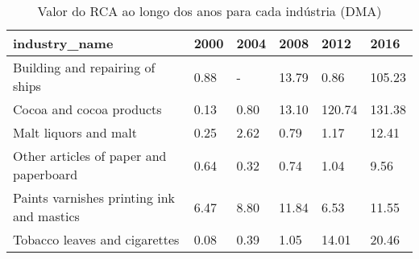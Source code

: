 \begin{table}
\centering
\caption{Valor do RCA ao longo dos anos para cada indústria (DMA)}
\begin{tabular}{p{6cm}p{1.5cm}p{1.5cm}p{1.5cm}p{1.5cm}p{1.5cm}}
\toprule
                            industry\_name & 2000 & 2004 &  2008 &   2012 &   2016 \\
\midrule
          Building and repairing of ships & 0.88 &    - & 13.79 &   0.86 & 105.23 \\
                 Cocoa and cocoa products & 0.13 & 0.80 & 13.10 & 120.74 & 131.38 \\
                    Malt liquors and malt & 0.25 & 2.62 &  0.79 &   1.17 &  12.41 \\
   Other articles of paper and paperboard & 0.64 & 0.32 &  0.74 &   1.04 &   9.56 \\
Paints varnishes printing ink and mastics & 6.47 & 8.80 & 11.84 &   6.53 &  11.55 \\
            Tobacco leaves and cigarettes & 0.08 & 0.39 &  1.05 &  14.01 &  20.46 \\
\bottomrule
\end{tabular}
\end{table}
